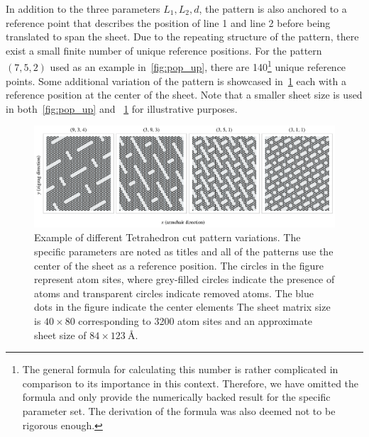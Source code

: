 In addition to the three parameters $L_1, L_2, d$, the pattern is also anchored
to a reference point that describes the position of line 1 and line 2 before
being translated to span the sheet. Due to the repeating structure of the
pattern, there exist a small finite number of unique reference positions. For
the pattern $(7, 5, 2)$ used as an example in~\cref{fig:pop_up}, there are
140\footnote{The general formula for calculating this number is rather
complicated in comparison to its importance in this context. Therefore, we have
omitted the formula and only provide the numerically backed result for the
specific parameter set. The derivation of the formula was also deemed not to be
rigorous enough.} unique reference points. Some additional variation of the
pattern is showcased in~\cref{fig:pop_up_flavors} each with a reference position
at the center of the sheet. Note that a smaller sheet size is used in
both~\cref{fig:pop_up} and ~\cref{fig:pop_up_flavors} for illustrative purposes.

\begin{figure}[h]
  \centering
  \includegraphics[width=\linewidth]{figures/system/pop_up_flavors.pdf}
  \caption{Example of different Tetrahedron cut pattern variations. The specific parameters are noted as titles and all of the patterns use the center of the sheet as a reference position. The circles in the figure represent atom sites, where grey-filled circles indicate the presence of atoms and transparent circles indicate removed atoms. The blue dots in the figure indicate the center elements The sheet matrix size is $40 \times 80$ corresponding to 3200 atom sites and an approximate sheet size of $84 \times \SI{123}{\text{Å}}$.}
  \label{fig:pop_up_flavors}
\end{figure}


